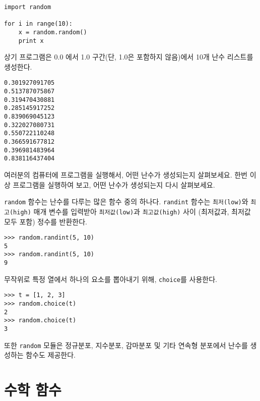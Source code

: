 \beforeverb
\begin{verbatim}
import random

for i in range(10):
    x = random.random()
    print x
\end{verbatim}
\afterverb
%

상기 프로그램은 0.0 에서 1.0 구간(단,  1.0은 포함하지 않음)에서 10개 난수 리스트를 생성한다.

\beforeverb
\begin{verbatim}
0.301927091705
0.513787075867
0.319470430881
0.285145917252
0.839069045123
0.322027080731
0.550722110248
0.366591677812
0.396981483964
0.838116437404
\end{verbatim}
\afterverb
%

\begin{ex}
여러분의 컴퓨터에 프로그램을 실행해서, 어떤 난수가 생성되는지 살펴보세요.
한번 이상 프로그램을 실행하여 보고, 어떤 난수가 생성되는지 다시 살펴보세요.
\end{ex}

{\tt random} 함수는 난수를 다루는 많은 함수 중의 하나다.
{\tt randint} 함수는 {\tt 최저(low)}와 {\tt 최고(high)} 매개 변수를 입력받아 
{\tt 최저값(low)}과 {\tt 최고값(high)} 사이 (최저값과, 최저값 모두 포함) 정수를 반환한다.


\beforeverb
\begin{verbatim}
>>> random.randint(5, 10)
5
>>> random.randint(5, 10)
9
\end{verbatim}
\afterverb
%

무작위로 특정 열에서 하나의 요소를 뽑아내기 위해, {\tt choice}를 사용한다.


\beforeverb
\begin{verbatim}
>>> t = [1, 2, 3]
>>> random.choice(t)
2
>>> random.choice(t)
3
\end{verbatim}
\afterverb
%

또한 {\tt random} 모듈은 정규분포, 지수분포, 감마분포 및 기타 연속형 분포에서 난수를 생성하는 함수도 제공한다.

\section{수학 함수}


